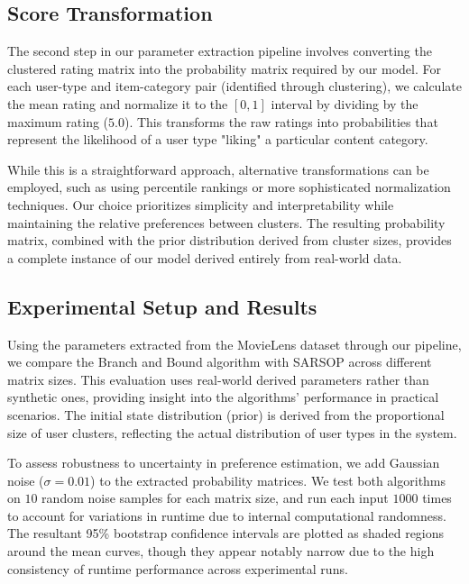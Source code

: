 \subsection{Score Transformation}

The second step in our parameter extraction pipeline involves converting the clustered rating matrix into the probability matrix required by our model. For each user-type and item-category pair (identified through clustering), we calculate the mean rating and normalize it to the $[0,1]$ interval by dividing by the maximum rating ($5.0$). This transforms the raw ratings into probabilities that represent the likelihood of a user type "liking" a particular content category.

While this is a straightforward approach, alternative transformations can be employed, such as using percentile rankings or more sophisticated normalization techniques. Our choice prioritizes simplicity and interpretability while maintaining the relative preferences between clusters. The resulting probability matrix, combined with the prior distribution derived from cluster sizes, provides a complete instance of our model derived entirely from real-world data.

\subsection{Experimental Setup and Results}

Using the parameters extracted from the MovieLens dataset through our pipeline, we compare the Branch and Bound algorithm with SARSOP across different matrix sizes. This evaluation uses real-world derived parameters rather than synthetic ones, providing insight into the algorithms' performance in practical scenarios. The initial state distribution (prior) is derived from the proportional size of user clusters, reflecting the actual distribution of user types in the system.

To assess robustness to uncertainty in preference estimation, we add Gaussian noise ($\sigma = 0.01$) to the extracted probability matrices. We test both algorithms on $10$ random noise samples for each matrix size, and run each input $1000$ times to account for variations in runtime due to internal computational randomness. The resultant 95\% bootstrap confidence intervals are plotted as shaded regions around the mean curves, though they appear notably narrow due to the high consistency of runtime performance across experimental runs.

